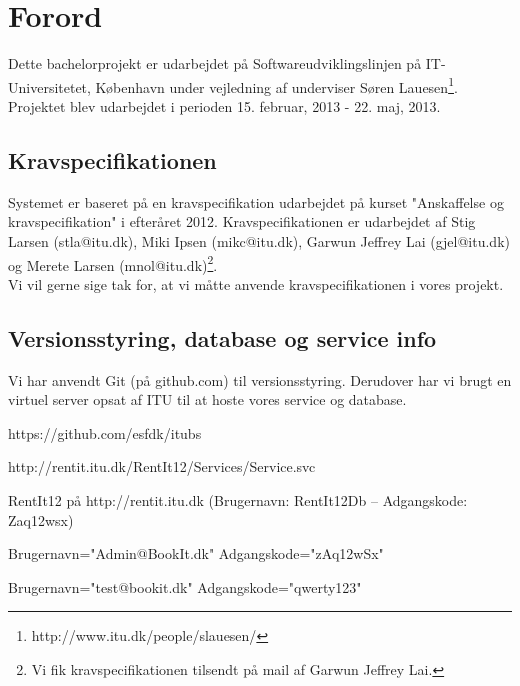 \chapter{Forord}
\label{Preface}
Dette bachelorprojekt er udarbejdet på Softwareudviklingslinjen på IT-Universitetet, København under vejledning af underviser Søren Lauesen\footnote{http://www.itu.dk/people/slauesen/}. Projektet blev udarbejdet i perioden 15. februar, 2013 - 22. maj, 2013.

\section*{Kravspecifikationen}
\label{Intro_kravspec}
Systemet er baseret på en kravspecifikation udarbejdet på kurset "Anskaffelse og kravspecifikation" i efteråret 2012. Kravspecifikationen er udarbejdet af Stig Larsen (stla@itu.dk), Miki Ipsen (mikc@itu.dk), Garwun Jeffrey Lai (gjel@itu.dk) og Merete Larsen (mnol@itu.dk)\footnote{Vi fik kravspecifikationen tilsendt på mail af Garwun Jeffrey Lai.}.
\\Vi vil gerne sige tak for, at vi måtte anvende kravspecifikationen i vores projekt.

\section*{Versionsstyring, database og service info}
\label{Intro_vs}
Vi har anvendt Git (på github.com) til versionsstyring. Derudover har vi brugt en virtuel server opsat af ITU til at hoste vores service og database.
\begin{my_description}
\item[GitHub repository] https://github.com/esfdk/itubs
\item[Service URL] http://rentit.itu.dk/RentIt12/Services/Service.svc
\item[Database] RentIt12 på http://rentit.itu.dk (Brugernavn: RentIt12Db -- Adgangskode: Zaq12wsx)
\item[Test Administrator] Brugernavn="Admin@BookIt.dk" Adgangskode="zAq12wSx"
\item[Test Bruger] Brugernavn="test@bookit.dk" Adgangskode="qwerty123"
\end{my_description}